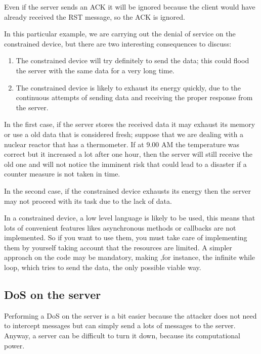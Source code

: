 	Even if the server sends an ACK it will be ignored because the client would have already received the RST message, so the ACK is ignored.\newline
	
	In this particular example, we are carrying out the denial of service on the constrained device, but there are two interesting consequences to discuss:
	\begin{enumerate}
		\item The constrained device will try definitely to send the data; this could flood the server with the same data for a very long time.
		\item The constrained device is likely to exhaust its energy quickly, due to the continuous attempts of sending data and receiving the proper response from the server.
	\end{enumerate}

	In the first case, if the server stores the received data it may exhaust its memory or use a old data that is considered fresh; suppose that we are dealing with a nuclear reactor that has a thermometer. If at 9.00 AM the temperature was correct but it increased a lot after one hour, then the server will still receive the old one and will not notice the imminent risk that could lead to a disaster if a counter measure is not taken in time.\newline
	
	In the second case, if the constrained device exhausts its energy then the server may not proceed with its task due to the lack of data.\newline
	
	In a constrained device, a low level language is likely to be used, this means that lots of convenient features likes asynchronous methods or callbacks are not implemented. So if you want to use them, you must take care of implementing them by yourself taking account that the resources are limited. A simpler approach on the code may be mandatory, making ,for instance, the infinite while loop, which tries to send the data, the only possible viable way.\newline
	
	\subsection{DoS on the server}
	Performing a DoS on the server is a bit easier because the attacker does not need to intercept messages but can simply send a lots of messages to the server.\\
	Anyway, a server can be difficult to turn it down, because its computational power.\\
	
